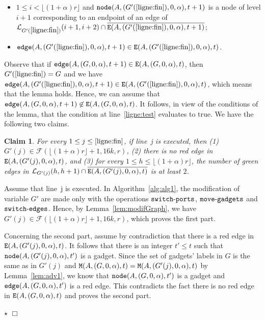 \documentclass[11pt]{article}
\newtheorem{claim}{Claim}[section]
\newcommand{\qed}{\hfill $\Box$ \bigbreak}
\newenvironment{proof}{\noindent {\bf Proof.}}{\qed}
\newenvironment{proofclaim}{\noindent{\bf Proof of the claim.}}{\hfill$\star$}
\begin{document}
{\begin{proof}
\begin{itemize}
\item $1\leq i<\lfloor(1+\alpha)r\rfloor$ and ${\tt node}(A,(G'(\ref{ligne:fin}),0,\alpha),t+1)$ is a node of level $i+1$ corresponding to an endpoint of an edge of $\mathcal{L}_{G'(\ref{ligne:fin})}(i+1,i+2)\cap\overline{{\tt E}(A,(G'({\ref{ligne:fin}}),0,\alpha),t+1)}$;
\item ${\tt edge}(A,(G'(\ref{ligne:fin}),0,\alpha),t+1)\in{\tt E}(A,(G'(\ref{ligne:fin}),0,\alpha),t)$.
\end{itemize}

Observe that if ${\tt edge}(A,(G,0,\alpha),t+1)\in {\tt E}(A,(G,0,\alpha),t)$, then $G'(\ref{ligne:fin})=G$ and we have 
${\tt edge}(A,(G'(\ref{ligne:fin}),0,\alpha),t+1)\in{\tt E}(A,(G'(\ref{ligne:fin}),0,\alpha),t)$, which means that the lemma holds. Hence, we can assume that ${\tt edge}(A,(G,0,\alpha),t+1)\not\in {\tt E}(A,(G,0,\alpha),t)$. It follows, in view of the conditions of the lemma,  that the condition at line~\ref{ligne:test} evaluates to true. We have the following two claims.

\begin{claim}\label{claim:triv}
For every $1\leq j \leq \ref{ligne:fin}$, if line~j is executed, then (1) $G'(j)\in\mathcal{F}(\lfloor(1+\alpha)r\rfloor+1,16k,r)$, (2) there is no red edge in ${\tt E}(A,(G'(j),0,\alpha),t)$, and (3) for every $1\leq h\leq\lfloor(1+\alpha)r\rfloor$, the number of green edges in $\mathcal{L}_{G'(j)}(h,h+1)\cap\overline{{\tt E}(A,(G'(j),0,\alpha),t)}$ is at least $2$.
\end{claim}

\begin{proofclaim}
Assume that line~j is executed. In Algorithm~\ref{alg:alg1}, the modification of variable $G'$ are made only with the operations ${\tt switch\mbox{-}ports}$, ${\tt move\mbox{-}gadgets}$ and ${\tt switch\mbox{-}edges}$. Hence, by Lemma~\ref{lem:modifGraph}, we have $G'(j)\in\mathcal{F}(\lfloor(1+\alpha)r\rfloor+1,16k,r)$, which proves the first part. 

Concerning the second part, assume by contradiction that there is a red edge in  ${\tt E}(A,(G'(j),0,\alpha),t)$. It follows that there is an integer $t'\leq t$ such that  ${\tt node}(A,(G'(j),0,\alpha),t')$ is a gadget. Since the set of gadgets' labels in $G$ is the same as in $G'(j)$ and ${\tt M}(A,(G,0,\alpha),t)={\tt M}(A,(G'(j),0,\alpha),t)$ by Lemma~\ref{lem:adv1}, we know that ${\tt node}(A,(G,0,\alpha),t')$ is a gadget and ${\tt edge}(A,(G,0,\alpha),t')$ is a red edge. This contradicts the fact there is no red edge in ${\tt E}(A,(G,0,\alpha),t)$ and proves the second part.


\end{proofclaim}
\end{proof}}
\end{document}

